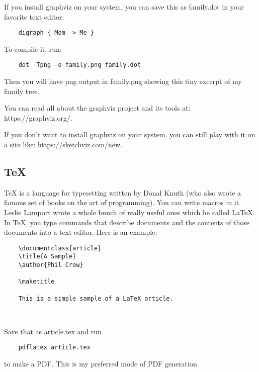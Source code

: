 If you install graphviz on your system, you can save this as family.dot
in your favorite text editor:

{\footnotesize
\begin{verbatim}
    digraph { Mom -> Me }
\end{verbatim}
}

To compile it, run:

{\footnotesize
\begin{verbatim}
    dot -Tpng -o family.png family.dot
\end{verbatim}
}

Then you will have png output in family.png showing this tiny excerpt
of my family tree.

You can read all about the graphviz project and its tools at:
https://graphviz.org/.

If you don't want to install graphviz on your system, you can
still play with it on a site like: https://sketchviz.com/new.

\subsection{TeX}

TeX is a language for typesetting written by Donal Knuth (who also
wrote a famous set of books on the art of programming).
You can write macros in it. Leslie Lamport
wrote a whole bunch of really useful ones which he called LaTeX. In TeX,
you type commands that describe documents and the contents of those
documents into a text editor. Here is an example:

{\footnotesize
\begin{verbatim}
    \documentclass{article}
    \title{A Sample}
    \author{Phil Crow}
    
    \maketitle

    This is a simple sample of a LaTeX article.

    
\end{verbatim}
}

Save that as article.tex and run

{\footnotesize
\begin{verbatim}
    pdflatex article.tex
\end{verbatim}
}

to make a PDF. This is my preferred mode of PDF generation.

